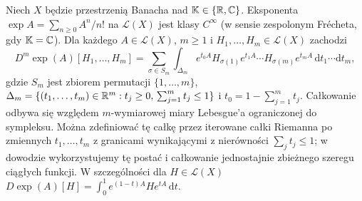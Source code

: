 \begin{twierdzenie}
\label{thm:exp-derivatives15}
Niech $X$ będzie przestrzenią Banacha nad $\mathbb K\in\{\mathbb R,\mathbb C\}$.
Eksponenta $\exp A=\sum_{n\ge0}A^n/n!$ na $\mathcal L(X)$
jest klasy $C^\infty$ (w sensie zespolonym Frécheta, gdy $\mathbb K=\mathbb C$). Dla każdego $A\in\mathcal L(X)$, $m\ge1$ i $H_1,\ldots,H_m\in\mathcal L(X)$ zachodzi
\[
 D^m\exp(A)[H_1,\ldots,H_m]
 =\sum_{\sigma\in S_m}\int_{\Delta_m}
 e^{t_0 A} H_{\sigma(1)}e^{t_1 A}\cdots
 H_{\sigma(m)}e^{t_m A}\,\mathrm dt_1\cdots\mathrm dt_m,
\]
gdzie $S_m$ jest zbiorem permutacji $\{1,\ldots,m\}$, $\Delta_m=\{(t_1,\ldots,t_m)\in\mathbb R^m:t_j\ge0,\,
\sum_{j=1}^m t_j\le1\}$ i $t_0=1-\sum_{j=1}^m t_j$.
Całkowanie odbywa się względem $m$-wymiarowej miary Lebesgue'a ograniczonej do sympleksu. Można zdefiniować tę całkę przez iterowane całki Riemanna po zmiennych $t_1,\ldots,t_m$ z granicami wynikającymi z nierówności $\sum_jt_j\le1$; w dowodzie wykorzystujemy tę postać i całkowanie jednostajnie zbieżnego szeregu ciągłych funkcji. W szczególności dla $H\in\mathcal L(X)$
$D\exp(A)[H]=\int_0^1 e^{(1-t)A}He^{tA}\,\mathrm dt$.
\end{twierdzenie}
